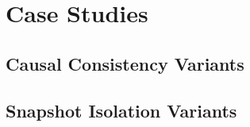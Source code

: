 
\section{Case Studies} \label{section:case-study}

\subsection{Causal Consistency Variants} \label{ss:cc-variants}

\subsection{Snapshot Isolation Variants} \label{ss:si-variants}

